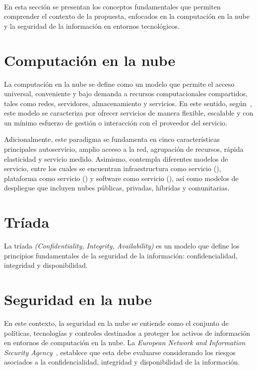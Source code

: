 \label{cap:marcoConceptual}
\mbox{}\\
\noindent
En esta sección se presentan los conceptos fundamentales que permiten comprender el contexto de la propuesta, enfocados en la 
computación en la nube y la seguridad de la información en entornos tecnológicos.

\noindent
\section{Computación en la nube}
\noindent
La computación en la nube se define como un modelo que permite el acceso universal, conveniente y bajo demanda a recursos computacionales 
compartidos, tales como redes, servidores, almacenamiento y servicios. En este sentido, según~\cite{mell2011nist}, este modelo se 
caracteriza por ofrecer servicios de manera flexible, escalable y con un mínimo esfuerzo de gestión o interacción con el proveedor del servicio.

Adicionalmente, este paradigma se fundamenta en cinco características principales autoservicio, amplio acceso a la red, agrupación 
de recursos, rápida elasticidad y servicio medido. Asimismo, contempla diferentes modelos de servicio, entre los cuales se encuentran infraestructura 
como servicio (\IaaS), plataforma como servicio (\PaaS) y software como servicio (\SaaS), así como modelos de despliegue que incluyen nubes públicas,
privadas, híbridas y comunitarias.

\section{Tríada \CIA}
\noindent
La tríada \CIA \textit{(Confidentiality, Integrity, Availability)} es un modelo que define los principios fundamentales de la seguridad de 
la información: confidencialidad, integridad y disponibilidad.~\cite{stallings2012computer}

\section{Seguridad en la nube}
\noindent
En este contexto, la seguridad en la nube se entiende como el conjunto de políticas, tecnologías y controles destinados a proteger 
los activos de información en entornos de computación en la nube. La \textit{European Network and Information Security 
Agency}~\cite{enisa2009cloud}, establece que esta debe evaluarse considerando los riesgos asociados a la confidencialidad, integridad y 
disponibilidad de la información.

